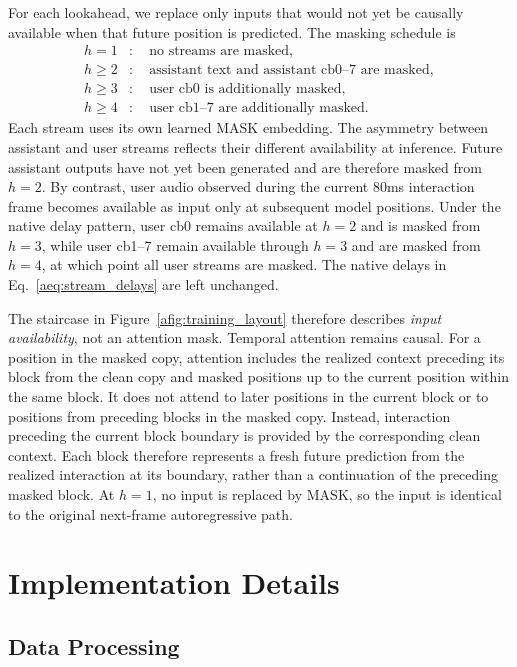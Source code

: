 For each lookahead, we replace only inputs that would not yet be causally available when that future position is predicted.
The masking schedule is
\begin{equation}
\begin{aligned}
h=1 &: \quad \text{no streams are masked},\\
h\ge2 &: \quad \text{assistant text and assistant cb0--7 are masked},\\
h\ge3 &: \quad \text{user cb0 is additionally masked},\\
h\ge4 &: \quad \text{user cb1--7 are additionally masked}.
\end{aligned}
\label{aeq:mask_schedule}
\end{equation}
Each stream uses its own learned MASK embedding.
The asymmetry between assistant and user streams reflects their different availability at inference.
Future assistant outputs have not yet been generated and are therefore masked from $h=2$.
By contrast, user audio observed during the current 80ms interaction frame becomes available as input only at subsequent model positions.
Under the native delay pattern, user cb0 remains available at $h=2$ and is masked from $h=3$, while user cb1--7 remain available through $h=3$ and are masked from $h=4$, at which point all user streams are masked.
The native delays in Eq.~\ref{aeq:stream_delays} are left unchanged.

The staircase in Figure~\ref{afig:training_layout} therefore describes \emph{input availability}, not an attention mask.
Temporal attention remains causal.
For a position in the masked copy, attention includes the realized context preceding its block from the clean copy and masked positions up to the current position within the same block.
It does not attend to later positions in the current block or to positions from preceding blocks in the masked copy.
Instead, interaction preceding the current block boundary is provided by the corresponding clean context.
Each block therefore represents a fresh future prediction from the realized interaction at its boundary, rather than a continuation of the preceding masked block.
At $h=1$, no input is replaced by MASK, so the input is identical to the original next-frame autoregressive path.

\section{Implementation Details}
\label{asec:implementation}

\subsection{Data Processing}
\label{asubsec:data_processing}

